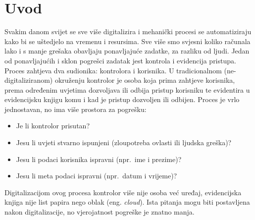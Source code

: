 \chapter{Uvod}

Svakim danom svijet se sve više digitalizira i mehanički procesi se automatiziraju kako bi se uštedjelo na vremenu i resursima.
Sve više smo svjesni koliko računala lako i s manje grešaka obavljaju ponavljajuće zadatke, za razliku od ljudi.
Jedan od ponavljajućih i sklon pogrešci zadatak jest kontrola i evidencija pristupa.
Proces zahtjeva dva sudionika: kontrolora i korisnika.
U tradicionalnom (ne-digitaliziranom) okruženju kontrolor je osoba koja prima zahtjeve korisnika, prema određenim uvjetima
dozvoljava ili odbija pristup korisniku te evidentira u evidencijsku knjigu komu i kad je pristup dozvoljen ili odbijen.
Proces je vrlo jednostavan, no ima više prostora za pogrešku:
\begin{itemize}
    \item Je li kontrolor prisutan?
    \item Jesu li uvjeti stvarno ispunjeni (zloupotreba ovlasti ili ljudska greška)?
    \item Jesu li podaci korisnika ispravni (npr.\ ime i prezime)?
    \item Jesu li meta podaci ispravni (npr.\ datum i vrijeme)?
\end{itemize}
Digitalizacijom ovog procesa kontrolor više nije osoba već uređaj, evidencijska knjiga nije list papira nego oblak (eng. \textit{cloud}).
Ista pitanja mogu biti postavljena nakon digitalizacije, no vjerojatnost pogreške je znatno manja.
